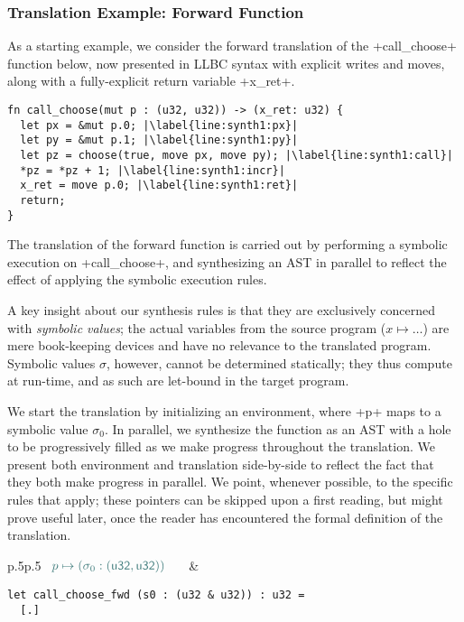 \documentclass[acmsmall,screen]{acmart}
\newif\iflong
\newcommand\kw[1]{\ensuremath{\mathsf{#1}}}
\begin{document}
\iflong

\subsubsection{Translation Example: Forward Function}

As a starting example, we consider the forward translation of the
\li+call_choose+ function below, now presented in LLBC syntax with explicit
writes and moves, along with a fully-explicit return variable \li+x_ret+.
\begin{verbatim}
fn call_choose(mut p : (u32, u32)) -> (x_ret: u32) {
  let px = &mut p.0; |\label{line:synth1:px}|
  let py = &mut p.1; |\label{line:synth1:py}|
  let pz = choose(true, move px, move py); |\label{line:synth1:call}|
  *pz = *pz + 1; |\label{line:synth1:incr}|
  x_ret = move p.0; |\label{line:synth1:ret}|
  return;
}
\end{verbatim}
The translation of the forward function is carried out by performing a symbolic execution on
\li+call_choose+, and synthesizing an AST in parallel to reflect the effect of applying
the symbolic execution rules.

A key insight about our synthesis rules is that they are exclusively concerned
with \emph{symbolic values}; the actual variables from the source program
($x\mapsto\dots$) are mere book-keeping devices and have no relevance to the
translated program. Symbolic values $\sigma$, however, cannot be determined
statically; they thus compute at run-time, and as such are let-bound in the
target program.

We start the translation by initializing an environment, where \li+p+ maps to a symbolic
value $\sigma_0$. In parallel, we synthesize the function as an AST with a hole to be
progressively filled as we make progress throughout the translation.
We present both environment and translation side-by-side to reflect
the fact that they both make progress in parallel. We point, whenever
possible, to the specific rules that apply; these pointers can be skipped upon a
first reading, but might prove useful later, once the reader has encountered the
formal definition of the translation.


\medskip
\noindent
\begin{tabular}{p{}p{}}
\small
$
\color{envcolor}
\begin{array}{l}
  p \mapsto (\sigma_0 : (\kw{u32}, \kw{u32})) \quad
\end{array}
$
\normalsize
&
\begin{minipage}[t]{0.5\textwidth}
\begin{verbatim}
let call_choose_fwd (s0 : (u32 & u32)) : u32 =
  [.]
\end{verbatim}
\end{minipage}
\end{tabular}
\end{document}
